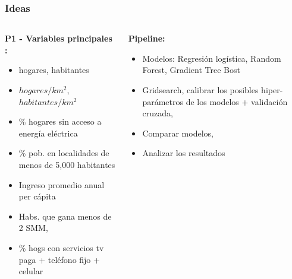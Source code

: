 \documentclass[xcolor=dvipsnames, compress]{beamer}
\begin{document}
\begin{frame}
\frametitle{Ideas}
\begin{columns}
	\begin{column}{0.5\textwidth}  %
		\textbf{P1 - Variables principales :}
		\begin{itemize}
			\item hogares, habitantes
			\item $hogares/km^2$, $habitantes/km^2$
			\item \% hogares sin acceso a energía eléctrica
			\item \% pob. en localidades de menos de 5,000 habitantes
			\item Ingreso promedio anual per cápita
			\item Habs. que gana menos de 2 SMM,
			\item \% hogs con servicios tv paga + teléfono fijo + celular
		\end{itemize}
		
	\end{column}
	\begin{column}{0.5\textwidth}
		\textbf{Pipeline:}
		\begin{itemize}
			\item Modelos: Regresión logística, Random Forest, Gradient Tree Bost
			\item Gridsearch, calibrar los posibles hiper-parámetros de los modelos + validación cruzada,
			\item Comparar modelos,
			\item Analizar los resultados	
		\end{itemize}
		
		
	\end{column}
\end{columns}

\end{frame}


%
 
\end{document}
